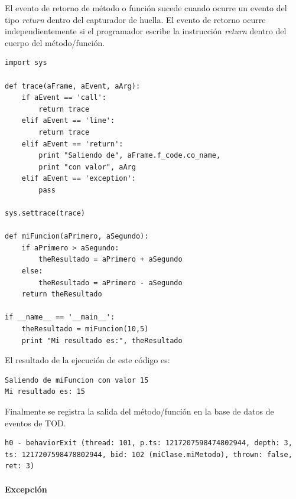 \documentclass[12pt,legalpaper]{report}
\begin{document}
El evento de retorno de método o función sucede cuando ocurre un evento del tipo \textit{return} dentro del capturador de huella.  El evento de retorno ocurre independientemente si el programador escribe la instrucción \textit{return} dentro del cuerpo del método/función.			

\begin{singlespace}
\begin{lstlisting}[style=Python]
import sys

def trace(aFrame, aEvent, aArg):
    if aEvent == 'call':
        return trace
    elif aEvent == 'line':
        return trace
    elif aEvent == 'return':
        print "Saliendo de", aFrame.f_code.co_name, 
        print "con valor", aArg
    elif aEvent == 'exception':
        pass

sys.settrace(trace)

def miFuncion(aPrimero, aSegundo):
    if aPrimero > aSegundo:
        theResultado = aPrimero + aSegundo
    else:
        theResultado = aPrimero - aSegundo
    return theResultado

if __name__ == '__main__':
    theResultado = miFuncion(10,5)
    print "Mi resultado es:", theResultado
\end{lstlisting}
\end{singlespace}

El resultado de la ejecución de este código es:

\begin{singlespace}
\begin{lstlisting}[style=consola,numbers=none]
Saliendo de miFuncion con valor 15
Mi resultado es: 15
\end{lstlisting}
\end{singlespace}	


Finalmente se registra la salida del método/función en la base de datos de eventos de TOD.

\begin{singlespace}
\begin{lstlisting}[style=consola,numbers=none]
h0 - behaviorExit (thread: 101, p.ts: 1217207598474802944, depth: 3, ts: 1217207598478802944, bid: 102 (miClase.miMetodo), thrown: false, ret: 3)
\end{lstlisting}
\end{singlespace}	

				      
				\paragraph{Excepción \label{excepcion}}
				
\end{document}
